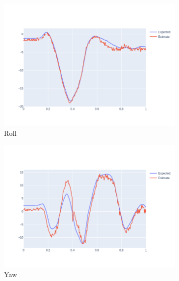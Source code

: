 \documentclass[12pt,a4paper,titlepage,final]{report}
\begin{document}
\begin{figure}[H]
  \centering
  \captionsetup{justification=centering}
  \begin{subfigure}[b]{0.32\textwidth}
    \includegraphics[width=\textwidth]{images/evaluation/geometry_roll_user_01_video_07.png}
   \caption{Roll}
    \label{fig:geo_roll}
  \end{subfigure}
  \begin{subfigure}[b]{0.32\textwidth}
    \includegraphics[width=\textwidth]{images/evaluation/geometry_yaw_user_01_video_07.png}
   \caption{Yaw}
    \label{fig:geo_yaw}
  \end{subfigure}
    \begin{subfigure}[b]{0.32\textwidth}

\end{subfigure}
\end{figure}
\end{document}
